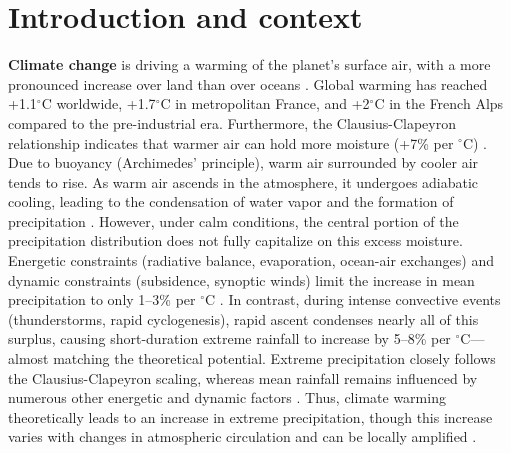 \documentclass[hess, manuscript]{copernicus}
\begin{document}

\section{Introduction and context}\label{introduction-and-context}

\textbf{Climate change} is driving a warming of the planet's surface
air, with a more pronounced increase over land than over oceans  \citep{IPCC2021}. Global warming has reached +1.1$^\circ$C worldwide, +1.7$^\circ$C in
metropolitan France, and +2$^\circ$C in the French Alps compared to the
pre-industrial era. Furthermore, the Clausius-Clapeyron relationship
indicates that warmer air can hold more moisture (+7\% per $^\circ$C)
\citep{clapeyron1834}. Due to buoyancy (Archimedes' principle), warm air surrounded by cooler air tends to rise. As warm air ascends in the
atmosphere, it undergoes adiabatic cooling, leading to the condensation
of water vapor and the formation of precipitation \citep{Lin08082022}.
However, under calm conditions, the central portion of the precipitation
distribution does not fully capitalize on this excess moisture.
Energetic constraints (radiative balance, evaporation, ocean-air
exchanges) and dynamic constraints (subsidence, synoptic winds) limit
the increase in mean precipitation to only 1--3\% per $^\circ$C \citep{IPCC2021}. In
contrast, during intense convective events (thunderstorms, rapid
cyclogenesis), rapid ascent condenses nearly all of this surplus,
causing short-duration extreme rainfall to increase by 5--8\% per
$^\circ$C---almost matching the theoretical potential. Extreme precipitation
closely follows the Clausius-Clapeyron scaling, whereas mean rainfall
remains influenced by numerous other energetic and dynamic factors
\citep{ogorman2015contrasting}. Thus, climate warming theoretically leads to an
increase in extreme precipitation, though this increase varies with
changes in atmospheric circulation and can be locally amplified \citep{blanchet2021explaining}.
\end{document}
